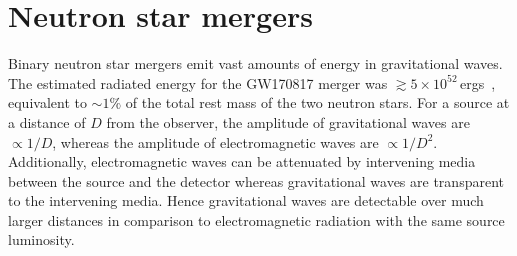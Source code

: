\documentclass[../Thesis.tex]{subfiles}
\begin{document}
    \section{Neutron star mergers} \label{sec:Intro:NeutronStarMergers}
    Binary neutron star mergers emit vast amounts of energy in gravitational waves.
    The estimated radiated energy for the GW170817 merger was $\gtrsim 5\times 10^{52}\,$ergs~\cite{GW170817Detection}, equivalent to $\sim 1\%$ of the total rest mass of the two neutron stars.
    For a source at a distance of $D$ from the observer, the amplitude of gravitational waves are  $\propto 1/D$, whereas the amplitude of electromagnetic waves are $\propto 1/D^2$.
    Additionally, electromagnetic waves can be attenuated by intervening media between the source and the detector whereas gravitational waves are transparent to the intervening media.
    Hence gravitational waves are detectable over much larger distances in comparison to electromagnetic radiation with the same source luminosity. \par
    
    
    
    
\end{document}
